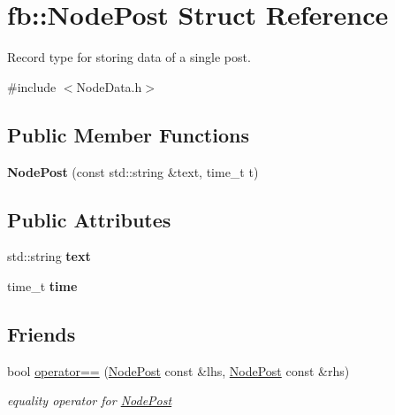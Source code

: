 \hypertarget{structfb_1_1_node_post}{\section{fb\+:\+:Node\+Post Struct Reference}
\label{structfb_1_1_node_post}
}


Record type for storing data of a single post.  




{\ttfamily \#include $<$Node\+Data.\+h$>$}

\subsection*{Public Member Functions}
\begin{DoxyCompactItemize}
\item 
\hypertarget{structfb_1_1_node_post_a468735d61288d64fc92a121bc3002c64}{{\bfseries Node\+Post} (const std\+::string \&text, time\+\_\+t t)}\label{structfb_1_1_node_post_a468735d61288d64fc92a121bc3002c64}

\end{DoxyCompactItemize}
\subsection*{Public Attributes}
\begin{DoxyCompactItemize}
\item 
\hypertarget{structfb_1_1_node_post_a4fc27a03e1f2cb36e0599481a187f976}{std\+::string {\bfseries text}}\label{structfb_1_1_node_post_a4fc27a03e1f2cb36e0599481a187f976}

\item 
\hypertarget{structfb_1_1_node_post_a7f38ab1d67f652cef4bbf911428d992f}{time\+\_\+t {\bfseries time}}\label{structfb_1_1_node_post_a7f38ab1d67f652cef4bbf911428d992f}

\end{DoxyCompactItemize}
\subsection*{Friends}
\begin{DoxyCompactItemize}
\item 
\hypertarget{structfb_1_1_node_post_a94b30eb9f6afc44cc238917dd503df7f}{bool \hyperlink{structfb_1_1_node_post_a94b30eb9f6afc44cc238917dd503df7f}{operator==} (\hyperlink{structfb_1_1_node_post}{Node\+Post} const \&lhs, \hyperlink{structfb_1_1_node_post}{Node\+Post} const \&rhs)}\label{structfb_1_1_node_post_a94b30eb9f6afc44cc238917dd503df7f}

\begin{DoxyCompactList}\small\item\em equality operator for \hyperlink{structfb_1_1_node_post}{Node\+Post} \end{DoxyCompactList}\end{DoxyCompactItemize}


